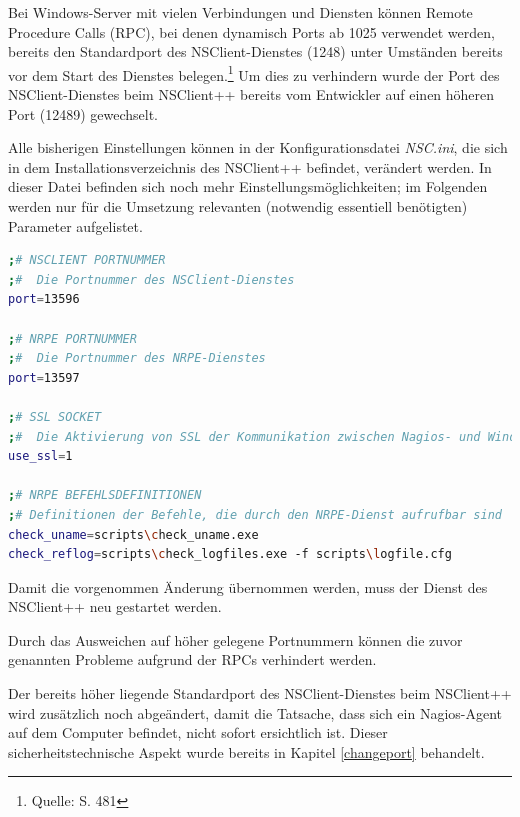 Bei Windows-Server mit vielen Verbindungen und Diensten können Remote Procedure Calls (\gls{RPC}), bei denen dynamisch Ports ab 1025 verwendet werden, bereits den Standardport des NSClient-Dienstes (1248) unter Umständen bereits vor dem Start des Dienstes belegen.\footnote{Quelle: \cite{Barth08} S. 481}
Um dies zu verhindern wurde der Port des NSClient-Dienstes beim NSClient++ bereits vom Entwickler auf einen höheren Port (12489) gewechselt.

Alle bisherigen Einstellungen können in der Konfigurationsdatei \textit{NSC.ini}, die sich in dem Installationsverzeichnis des NSClient++ befindet, verändert werden.
In dieser Datei befinden sich noch mehr Einstellungsmöglichkeiten; im Folgenden werden nur für die Umsetzung relevanten (notwendig essentiell benötigten) Parameter aufgelistet.

\begin{lstlisting}[captionpos=b, caption=NSClient++ Konfigurationsdatei, label=code:nsc, breaklines = true, language=sh]
;# NSCLIENT PORTNUMMER
;#  Die Portnummer des NSClient-Dienstes
port=13596

;# NRPE PORTNUMMER
;#  Die Portnummer des NRPE-Dienstes
port=13597

;# SSL SOCKET
;#  Die Aktivierung von SSL der Kommunikation zwischen Nagios- und Windows-Server 
use_ssl=1

;# NRPE BEFEHLSDEFINITIONEN
;# Definitionen der Befehle, die durch den NRPE-Dienst aufrufbar sind
check_uname=scripts\check_uname.exe
check_reflog=scripts\check_logfiles.exe -f scripts\logfile.cfg
\end{lstlisting}

Damit die vorgenommen Änderung übernommen werden, muss der Dienst des NSClient++ neu gestartet werden. 


Durch das Ausweichen auf höher gelegene Portnummern können die zuvor genannten Probleme aufgrund der \gls{RPC}s verhindert werden.

Der bereits höher liegende Standardport des NSClient-Dienstes beim NSClient++ wird zusätzlich noch abgeändert, damit die Tatsache, dass sich ein Nagios-Agent auf dem Computer befindet, nicht sofort ersichtlich ist.
Dieser sicherheitstechnische Aspekt wurde bereits in Kapitel \ref{changeport} behandelt.

